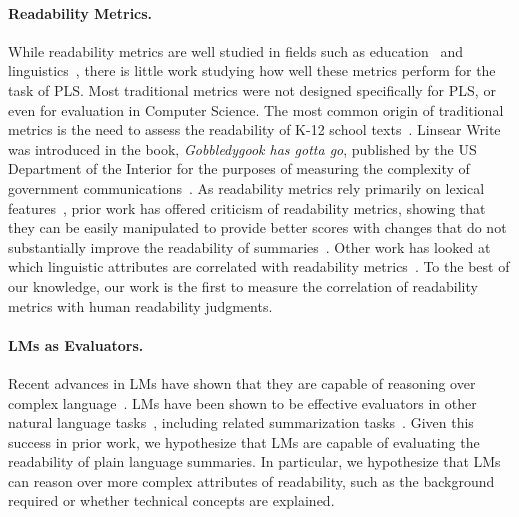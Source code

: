 \paragraph{Readability Metrics.} While readability metrics are well studied in fields such as education~\cite{ef903df0-98e8-341d-9e07-ada8904086a0, dubay2004principles, texts_2022} and linguistics~\cite{Pires02102017}, there is little work studying how well these metrics perform for the task of PLS. 
Most traditional metrics were not designed specifically for PLS, or even for evaluation in Computer Science. The most common origin of traditional metrics is the need to assess the readability of K-12 school texts~\cite{dale1948formula, Coleman1975ACR}. %
Linsear Write was introduced in the book, \textit{Gobbledygook has gotta go}, published by the US Department of the Interior for the purposes of measuring the complexity of government communications~\cite{o1966gobbledygook}.
As readability metrics rely primarily on lexical features~\cite{508dd5a7-e076-39ee-bf49-06f80e20c28d}, prior work has offered criticism of readability metrics, showing that they can be easily manipulated to provide better scores with changes that do not substantially improve the readability of summaries~\cite{Tanprasert2021FleschKincaidIN}. Other work has looked at which linguistic attributes are correlated with readability metrics~\cite{tajner2012WhatCR}. To the best of our knowledge, our work is the first to measure the correlation of readability metrics with human readability judgments.

\paragraph{LMs as Evaluators.} Recent advances in LMs have shown that they are capable of reasoning over complex language~\cite{Brown2020LanguageMA, Wei2022ChainOT, Yang2024DoLL}. LMs have been shown to be effective evaluators in other natural language tasks~\cite{li-etal-2025-exploring-reliability,10.1145/3640457.3688075,nedelchev-etal-2020-language,liu2023geval}, including related summarization tasks~\cite{song-etal-2024-finesure}. Given this success in prior work, we hypothesize that LMs are capable of evaluating the readability of plain language summaries. In particular, we hypothesize that LMs can reason over more complex attributes of readability, such as the background required or whether technical concepts are explained. 
